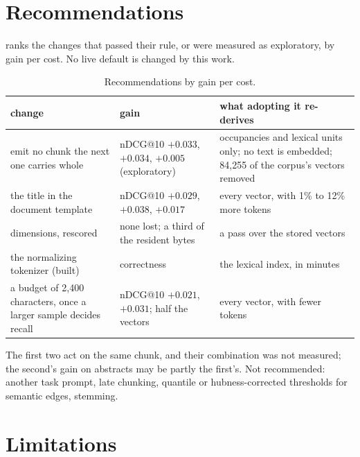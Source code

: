 \documentclass[11pt]{article}
\theoremstyle{plain}
\theoremstyle{definition}
\theoremstyle{remark}
\begin{document}
\section{Recommendations}

 ranks the changes that passed their rule, or were measured as exploratory, by
gain per cost. No live default is changed by this work.

\begin{table}[t]
\centering\small
\caption{Recommendations by gain per cost.}\label{tab:recs}
\begin{tabular}{>{\raggedright\arraybackslash}p{}>{\raggedright\arraybackslash}p{}>{\raggedright\arraybackslash}p{}}
\toprule
change & gain & what adopting it re-derives \\
\midrule
emit no chunk the next one carries whole & nDCG@10 $+0.033$, $+0.034$, $+0.005$ (exploratory) & occupancies and lexical units only; no text is embedded; 84{,}255 of the corpus's vectors removed \\
the title in the document template & nDCG@10 $+0.029$, $+0.038$, $+0.017$ & every vector, with 1\% to 12\% more tokens \\
256 dimensions, rescored & none lost; a third of the resident bytes & a pass over the stored vectors \\
the normalizing tokenizer (built) & correctness & the lexical index, in minutes \\
a budget of 2{,}400 characters, once a larger sample decides recall & nDCG@10 $+0.021$, $+0.031$; half the vectors & every vector, with fewer tokens \\
\bottomrule
\end{tabular}
\end{table}

The first two act on the same chunk, and their combination was not measured; the second's gain on
abstracts may be partly the first's. Not recommended: another task prompt, late chunking, quantile
or hubness-corrected thresholds for semantic edges, stemming.

\section{Limitations}
\end{document}
